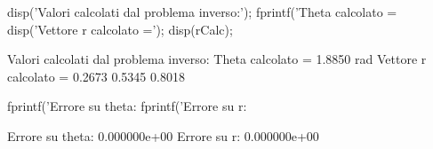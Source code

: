\documentclass[11pt, a4paper]{article}
\begin{document}
\begin{matlabcode}
disp('Valori calcolati dal problema inverso:');
fprintf('Theta calcolato = %
disp('Vettore r calcolato =');
disp(rCalc);
\end{matlabcode}
\begin{matlaboutput}
Valori calcolati dal problema inverso:
Theta calcolato = 1.8850 rad
Vettore r calcolato =
    0.2673
    0.5345
    0.8018
\end{matlaboutput}
\begin{matlabcode}
fprintf('Errore su theta: %
fprintf('Errore su r: %
\end{matlabcode}
\begin{matlaboutput}
Errore su theta: 0.000000e+00
Errore su r: 0.000000e+00
\end{matlaboutput}
\newpage
{}
\end{document}

